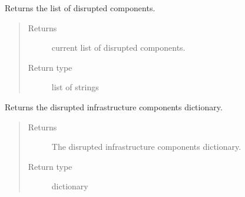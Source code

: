 \documentclass[letterpaper,10pt,english]{sphinxmanual}
\begin{document}
\begin{fulllineitems}
\begin{fulllineitems}
\begin{quote}
\begin{description}
\begin{itemize}
\end{itemize}

\end{description}\end{quote}

\end{fulllineitems}


\begin{fulllineitems}
\label{\detokenize{apidoc:dreaminsg_integrated_model.src.network_sim_models.integrated_network.IntegratedNetwork.get_disrupted_components}}
\sphinxAtStartPar
Returns the list of disrupted components.
\begin{quote}\begin{description}
\item[{Returns}] \leavevmode
\sphinxAtStartPar
current list of disrupted components.

\item[{Return type}] \leavevmode
\sphinxAtStartPar
list of strings

\end{description}\end{quote}

\end{fulllineitems}


\begin{fulllineitems}
\label{\detokenize{apidoc:dreaminsg_integrated_model.src.network_sim_models.integrated_network.IntegratedNetwork.get_disrupted_infra_dict}}
\sphinxAtStartPar
Returns the  disrupted infrastructure components dictionary.
\begin{quote}\begin{description}
\item[{Returns}] \leavevmode
\sphinxAtStartPar
The disrupted infrastructure components dictionary.

\item[{Return type}] \leavevmode
\sphinxAtStartPar
dictionary

\end{description}\end{quote}


\end{fulllineitems}
\end{fulllineitems}
\end{document}
